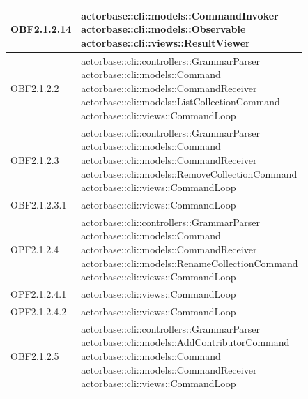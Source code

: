 \documentclass{scalatekids-article}
\begin{document}
\begin{longtable}[H]{|p{5cm}|p{12cm}|}
\hline
OBF2.1.2.14 & \multiLineCell[t]{actorbase::cli::models::CommandInvoker\\actorbase::cli::models::Observable\\actorbase::cli::views::ResultViewer\\}\\
\hline
OBF2.1.2.2 & \multiLineCell[t]{actorbase::cli::controllers::GrammarParser\\actorbase::cli::models::Command\\actorbase::cli::models::CommandReceiver\\actorbase::cli::models::ListCollectionCommand\\actorbase::cli::views::CommandLoop\\}\\
\hline
OBF2.1.2.3 & \multiLineCell[t]{actorbase::cli::controllers::GrammarParser\\actorbase::cli::models::Command\\actorbase::cli::models::CommandReceiver\\actorbase::cli::models::RemoveCollectionCommand\\actorbase::cli::views::CommandLoop\\}\\
\hline
OBF2.1.2.3.1 & \multiLineCell[t]{actorbase::cli::views::CommandLoop\\}\\
\hline
OPF2.1.2.4 & \multiLineCell[t]{actorbase::cli::controllers::GrammarParser\\actorbase::cli::models::Command\\actorbase::cli::models::CommandReceiver\\actorbase::cli::models::RenameCollectionCommand\\actorbase::cli::views::CommandLoop\\}\\
\hline
OPF2.1.2.4.1 & \multiLineCell[t]{actorbase::cli::views::CommandLoop\\}\\
\hline
OPF2.1.2.4.2 & \multiLineCell[t]{actorbase::cli::views::CommandLoop\\}\\
\hline
OBF2.1.2.5 & \multiLineCell[t]{actorbase::cli::controllers::GrammarParser\\actorbase::cli::models::AddContributorCommand\\actorbase::cli::models::Command\\actorbase::cli::models::CommandReceiver\\actorbase::cli::views::CommandLoop\\}\\

\end{longtable}
\end{document}
